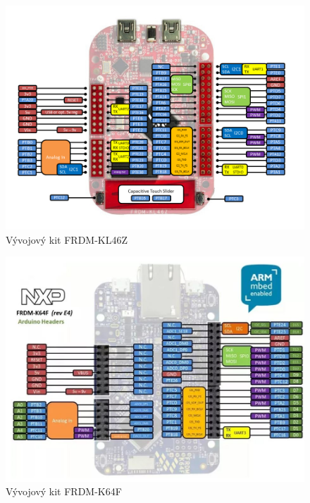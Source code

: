 \documentclass[a4paper]{article}
\begin{document}
\begin{figure}[h]
	\includegraphics[width=\textwidth]{frdm-kl46z-pins-description.png}
	\caption{Vývojový kit FRDM-KL46Z}
	\label{frdm-kl46z-pins-description}
\end{figure}

\begin{figure}[h]
	\includegraphics[width=\textwidth]{frdm-k64f-pins-description.jpg}
	\caption{Vývojový kit FRDM-K64F}
	\label{frdm-k64f-pins-description}
\end{figure}
\end{document}
